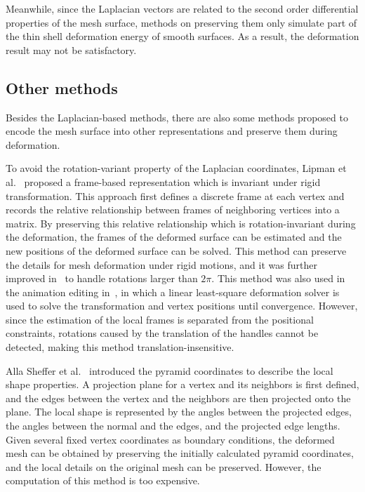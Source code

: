 Meanwhile,  since the Laplacian vectors are related to the second
order differential properties of the mesh surface, methods on
preserving them only simulate part of the thin shell deformation
energy of smooth surfaces. As a result, the deformation result may
not be satisfactory.


\subsection{Other methods}\label{ch2:sec:deformation:other}

Besides the Laplacian-based methods,  there are also some methods
proposed to encode the mesh surface into other representations and
preserve them during deformation.

To avoid the rotation-variant  property of the Laplacian
coordinates, Lipman et al.~\cite{LSLC05} proposed a frame-based
representation which is invariant under rigid transformation. This
approach first defines a discrete frame at each vertex and records
the relative relationship between frames of neighboring vertices
into a matrix. By preserving this relative relationship which is
rotation-invariant during the deformation, the frames of the
deformed surface can be estimated and the new positions of the
deformed surface can be solved. This method can preserve the details
for mesh deformation under rigid motions, and it was further
improved in~\cite{LCGL07} to handle rotations larger than $2\pi$.
This method was also used in the animation editing
in~\cite{XZYTPG07}, in which a linear least-square deformation
solver is used to solve the transformation and vertex positions
until convergence. However, since the estimation of the local frames
is separated from the positional constraints, rotations caused by
the translation of the handles cannot be detected, making this
method translation-insensitive.

Alla Sheffer et al.~\cite{SK04}  introduced the pyramid coordinates
to describe the local shape properties. A projection plane for a
vertex and its neighbors is first defined, and the edges between the
vertex and the neighbors are then projected onto the plane. The
local shape is represented by the angles between the projected
edges, the angles between the normal and the edges, and the
projected edge lengths. Given several fixed vertex coordinates as
boundary conditions, the deformed mesh can be obtained by preserving
the initially calculated pyramid coordinates, and the local details
on the original mesh can be preserved. However, the computation of
this method is too expensive.

